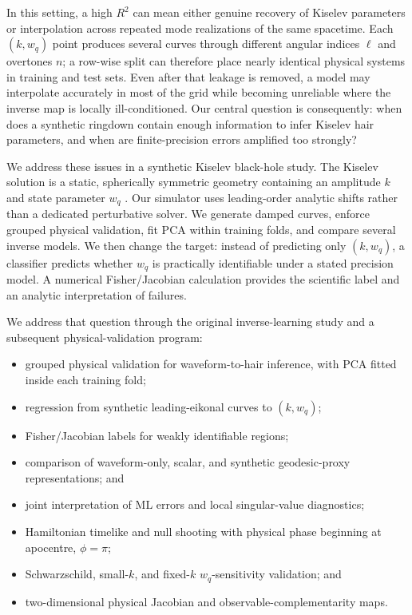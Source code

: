 \documentclass[conference]{IEEEtran}
\newcommand{\wq}{w_q}
\begin{document}
In this setting, a high $R^2$ can mean either genuine recovery of Kiselev
parameters or interpolation across repeated mode realizations of the same
spacetime. Each $(k,\wq)$ point produces several curves through different
angular indices $\ell$ and overtones $n$; a row-wise split can therefore place
nearly identical physical systems in training and test sets. Even after that
leakage is removed, a model may interpolate accurately in most of the grid
while becoming unreliable where the inverse map is locally ill-conditioned.
Our central question is consequently: when does a synthetic ringdown contain
enough information to infer Kiselev hair parameters, and when are
finite-precision errors amplified too strongly?

We address these issues in a synthetic Kiselev black-hole study. The Kiselev
solution is a static, spherically symmetric geometry containing an amplitude
$k$ and state parameter $\wq$ \cite{kiselev2003quintessence}. Our simulator uses
leading-order analytic shifts rather than a dedicated perturbative solver. We
generate damped curves, enforce grouped physical validation, fit PCA within
training folds, and compare several inverse models. We then change the target:
instead of predicting only $(k,\wq)$, a classifier predicts whether $\wq$ is
practically identifiable under a stated precision model. A numerical
Fisher/Jacobian calculation provides the scientific label and an analytic
interpretation of failures.

We address that question through the original inverse-learning study and a
subsequent physical-validation program:
\begin{itemize}
  \item grouped physical validation for waveform-to-hair inference, with PCA
  fitted inside each training fold;
  \item regression from synthetic leading-eikonal curves to $(k,\wq)$;
  \item Fisher/Jacobian labels for weakly identifiable regions;
  \item comparison of waveform-only, scalar, and synthetic geodesic-proxy
  representations; and
  \item joint interpretation of ML errors and local singular-value diagnostics;
  \item Hamiltonian timelike and null shooting with physical phase beginning
  at apocentre, $\phi=\pi$;
  \item Schwarzschild, small-$k$, and fixed-$k$ $\wq$-sensitivity validation;
  and
  \item two-dimensional physical Jacobian and observable-complementarity maps.
\end{itemize}
\end{document}
